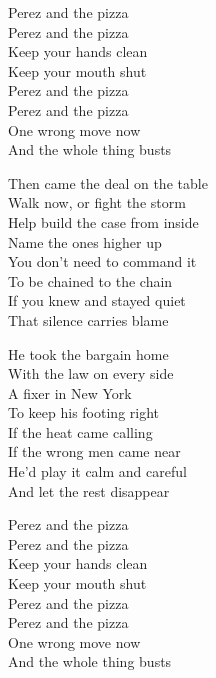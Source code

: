 \begin{lyrics}
Perez and the pizza\\
Perez and the pizza\\
Keep your hands clean\\
Keep your mouth shut\\
Perez and the pizza\\
Perez and the pizza\\
One wrong move now\\
And the whole thing busts

Then came the deal on the table\\
Walk now, or fight the storm\\
Help build the case from inside\\
Name the ones higher up\\
You don’t need to command it\\
To be chained to the chain\\
If you knew and stayed quiet\\
That silence carries blame

He took the bargain home\\
With the law on every side\\
A fixer in New York\\
To keep his footing right\\
If the heat came calling\\
If the wrong men came near\\
He’d play it calm and careful\\
And let the rest disappear

Perez and the pizza\\
Perez and the pizza\\
Keep your hands clean\\
Keep your mouth shut\\
Perez and the pizza\\
Perez and the pizza\\
One wrong move now\\
And the whole thing busts

\end{lyrics}

